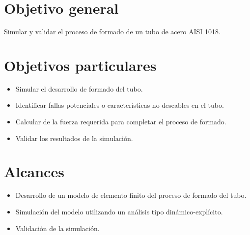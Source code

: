 

\section{Objetivo general}

Simular y validar el proceso de formado de un tubo de acero AISI 1018.

\section{Objetivos particulares}
\begin{itemize}
\item Simular el desarrollo de formado del tubo.
\item Identificar fallas potenciales o características no deseables en el tubo.
\item Calcular de la fuerza requerida para completar el proceso de formado.
\item Validar los resultados de la simulación.
\end{itemize}


\section{Alcances}

\begin{itemize}
\item Desarrollo de un modelo de elemento finito del proceso de formado del tubo.
\item Simulación del modelo utilizando un análisis tipo dinámico-explícito.
\item Validación de la simulación.
\end{itemize}


